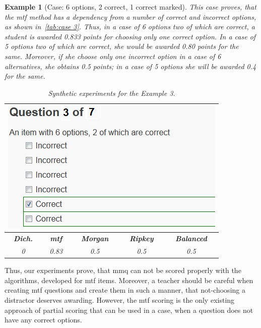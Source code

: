 \documentclass[PhD, Submit, ngerman,UKenglish,table]{scrbook}
\newtheorem{example}{Example}
\begin{document}
\begin{example}[Case: 6 options, 2 correct, 1 correct marked]
This case proves, that the \gls{mtf} method has a dependency from a number of correct and incorrect options, as shown in~\autoref{tab:case 3}. 
Thus, in a case of 6 options two of which are correct, a student is awarded 0.833 points for choosing only one correct option.
In a case of 5 options two of which are correct, she would be awarded 0.80 points for the same.
Moreover, if she choose only one incorrect option in a case of 6 alternatives, she obtains 0.5 points; in a case of 5 options she will be awarded 0.4 for the same.

\begin{table}[h!]
	\centering
	\begin{tabularx}{0.55\columnwidth}{c c c c c} 
	\toprule  
    \multicolumn{5}{c}{\includegraphics[width=0.4\columnwidth]{images/case3.jpg}}\\
    \midrule
    \textbf{Dich.}&\textbf{\gls{mtf}}&\textbf{Morgan}&\textbf{Ripkey}&\textbf{Balanced}\\
	\midrule
    0&0.83&0.5&0.5&0.5\\
	\bottomrule
    \end{tabularx}
	\caption{Synthetic experiments for the Example 3.}
	\label{tab:case 3}
\end{table}
\end{example}

Thus, our experiments prove, that \gls{mmq} can not be scored properly with the algorithms, developed for \gls{mtf} items.
Moreover, a teacher should be careful when creating \gls{mtf} questions and create them in such a manner, that not-choosing a distractor deserves awarding.
However, the \gls{mtf} scoring is the only existing approach of partial scoring that can be used in a case, when a question does not have any correct options.
\end{document}
